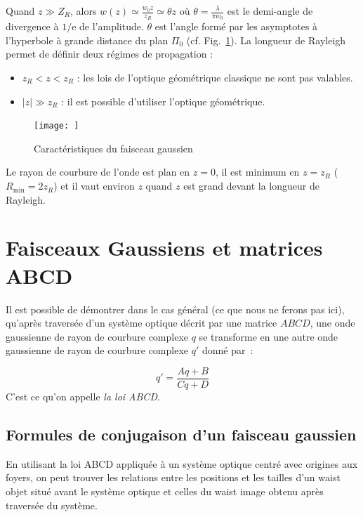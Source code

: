 \documentclass[a4paper]{book}
\begin{document}
Quand $z\gg Z_R$, alors $w(z)\simeq\frac{w_0z}{z_R}\simeq \theta z$ où $\theta = \frac{\lambda}{\pi w_0}$ est le demi-angle de divergence à $1/$e de
l'amplitude. $\theta$ est l'angle formé par les asymptotes à l'hyperbole à grande
distance du plan $\Pi_0$ (cf. Fig.~\ref{fig:carac_gauss}).
La longueur de Rayleigh permet de définir deux régimes de propagation :
\begin{itemize}
    \item $z_R < z < z_R$ : les lois de l'optique géométrique classique ne sont pas valables.
    \item $|z|\gg z_R$ : il est possible d'utiliser l'optique géométrique.
\end{itemize}


\begin{figure}[!htbp]
\begin{center}
\texttt{[image: ]}
\end{center}
\caption{Caractéristiques du faisceau gaussien}
\label{fig:carac_gauss}
\end{figure}

Le rayon de courbure de l'onde est plan en $z=0$, il est minimum en $z = z_R$ ($R_\textrm{min}=2z_R$) et il vaut environ $z$ quand $z$ est grand devant la longueur de Rayleigh.


\section{Faisceaux Gaussiens et matrices ABCD}

Il est possible de démontrer dans le cas général (ce que nous ne ferons pas ici), qu'après traversée d'un système optique décrit par une matrice $ABCD$, une onde gaussienne de rayon de courbure complexe $q$ se transforme en une autre onde gaussienne de rayon de courbure complexe $q'$ donné par~:

\begin{equation}
    q'=\frac{Aq+B}{Cq+D}
\end{equation}
C'est ce qu'on appelle \textit{la loi ABCD}.

\subsection{Formules de conjugaison d'un faisceau gaussien}

En utilisant la loi ABCD appliquée à un système optique centré avec origines aux foyers, on peut trouver les relations entre les positions et les tailles d'un waist objet situé avant le système optique et celles du waist image obtenu après traversée du système.
\end{document}
